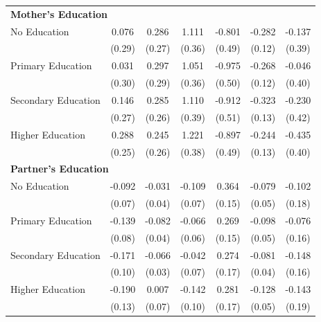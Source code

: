 \begin{longtable}{l*{6}{c}}
\multicolumn{7}{l}{\textbf{Mother's Education}} \\
No Education       & 0.076 & 0.286 & 1.111\sym{***} & -0.801 & -0.282\sym{**} & -0.137 \\
                    & (0.29) & (0.27) & (0.36) & (0.49) & (0.12) & (0.39) \\
Primary Education  & 0.031 & 0.297 & 1.051\sym{***} & -0.975\sym{*} & -0.268\sym{**} & -0.046 \\
                    & (0.30) & (0.29) & (0.36) & (0.50) & (0.12) & (0.40) \\
Secondary Education & 0.146 & 0.285 & 1.110\sym{***} & -0.912\sym{*} & -0.323\sym{**} & -0.230 \\
                    & (0.27) & (0.26) & (0.39) & (0.51) & (0.13) & (0.42) \\
Higher Education   & 0.288 & 0.245 & 1.221\sym{***} & -0.897\sym{*} & -0.244\sym{*} & -0.435 \\
                    & (0.25) & (0.26) & (0.38) & (0.49) & (0.13) & (0.40) \\

\multicolumn{7}{l}{\textbf{Partner's Education}} \\
No Education       & -0.092 & -0.031 & -0.109 & 0.364\sym{**} & -0.079 & -0.102 \\
                    & (0.07) & (0.04) & (0.07) & (0.15) & (0.05) & (0.18) \\
Primary Education  & -0.139\sym{*} & -0.082\sym{**} & -0.066 & 0.269\sym{*} & -0.098\sym{*} & -0.076 \\
                    & (0.08) & (0.04) & (0.06) & (0.15) & (0.05) & (0.16) \\
Secondary Education & -0.171\sym{*} & -0.066\sym{**} & -0.042 & 0.274 & -0.081\sym{*} & -0.148 \\
                    & (0.10) & (0.03) & (0.07) & (0.17) & (0.04) & (0.16) \\
Higher Education   & -0.190 & 0.007 & -0.142 & 0.281 & -0.128\sym{**} & -0.143 \\
                    & (0.13) & (0.07) & (0.10) & (0.17) & (0.05) & (0.19) \\


\end{longtable}
